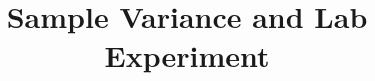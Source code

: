 

\subject{\textbf{Sheet 2}}
\title{Sample Variance and Lab Experiment}


\maketitle
\thispagestyle{empty}
\newpage




